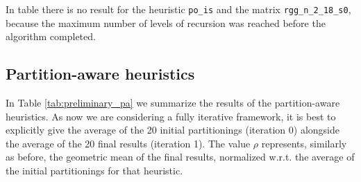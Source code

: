 In table there is no result for the heuristic \verb|po_is| and the  matrix \verb|rgg_n_2_18_s0|, because the maximum number of levels of recursion was reached before the algorithm completed.

\subsection{Partition-aware heuristics}

In Table \ref{tab:preliminary_pa} we summarize the results of the partition-aware heuristics. As now we are considering a fully iterative framework, it is best to explicitly give the average of the 20 initial partitionings (iteration 0) alongside the average of the 20 final results (iteration 1). The value $\rho$ represents, similarly as before, the geometric mean of the final results, normalized w.r.t. the average of the initial partitionings for that heuristic. 

